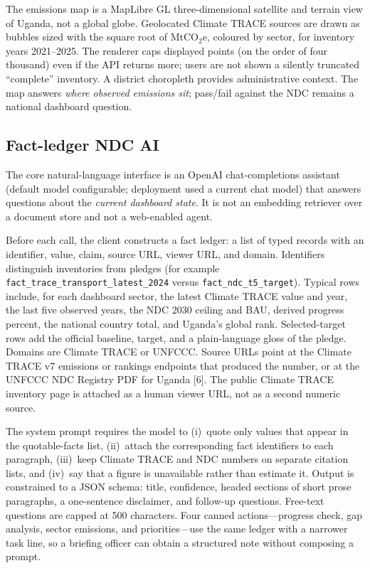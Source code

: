 \documentclass{article}
\begin{document}
The emissions map is a MapLibre GL three-dimensional satellite and terrain view of Uganda, not a global globe. Geolocated Climate TRACE sources are drawn as bubbles sized with the square root of MtCO$_2$e, coloured by sector, for inventory years 2021--2025. The renderer caps displayed points (on the order of four thousand) even if the API returns more; users are not shown a silently truncated ``complete'' inventory. A district choropleth provides administrative context. The map answers \emph{where observed emissions sit}; pass/fail against the NDC remains a national dashboard question.

\subsection{Fact-ledger NDC AI}
\label{sec:ndc-ai}

The core natural-language interface is an OpenAI chat-completions assistant (default model configurable; deployment used a current chat model) that answers questions about the \emph{current dashboard state}. It is not an embedding retriever over a document store and not a web-enabled agent.

Before each call, the client constructs a fact ledger: a list of typed records with an identifier, value, claim, source URL, viewer URL, and domain. Identifiers distinguish inventories from pledges (for example \texttt{fact\_trace\_transport\_latest\_2024} versus \texttt{fact\_ndc\_t5\_target}). Typical rows include, for each dashboard sector, the latest Climate TRACE value and year, the last five observed years, the NDC 2030 ceiling and BAU, derived progress percent, the national country total, and Uganda's global rank. Selected-target rows add the official baseline, target, and a plain-language gloss of the pledge. Domains are Climate TRACE or UNFCCC. Source URLs point at the Climate TRACE v7 emissions or rankings endpoints that produced the number, or at the UNFCCC NDC Registry PDF for Uganda [6]. The public Climate TRACE inventory page is attached as a human viewer URL, not as a second numeric source.

The system prompt requires the model to (i)~quote only values that appear in the quotable-facts list, (ii)~attach the corresponding fact identifiers to each paragraph, (iii)~keep Climate TRACE and NDC numbers on separate citation lists, and (iv)~say that a figure is unavailable rather than estimate it. Output is constrained to a JSON schema: title, confidence, headed sections of short prose paragraphs, a one-sentence disclaimer, and follow-up questions. Free-text questions are capped at 500 characters. Four canned actions---progress check, gap analysis, sector emissions, and priorities---use the same ledger with a narrower task line, so a briefing officer can obtain a structured note without composing a prompt.
\end{document}
